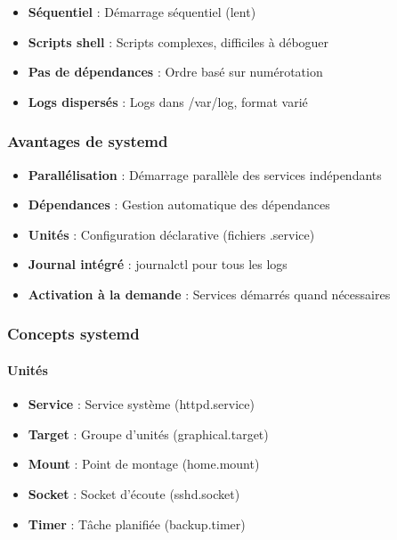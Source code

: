 \documentclass[12pt,a4paper]{article}
\begin{document}
\begin{itemize}
    \item \textbf{Séquentiel} : Démarrage séquentiel (lent)
    \item \textbf{Scripts shell} : Scripts complexes, difficiles à déboguer
    \item \textbf{Pas de dépendances} : Ordre basé sur numérotation
    \item \textbf{Logs dispersés} : Logs dans /var/log, format varié
\end{itemize}

\subsubsection{Avantages de systemd}

\begin{itemize}
    \item \textbf{Parallélisation} : Démarrage parallèle des services indépendants
    \item \textbf{Dépendances} : Gestion automatique des dépendances
    \item \textbf{Unités} : Configuration déclarative (fichiers .service)
    \item \textbf{Journal intégré} : journalctl pour tous les logs
    \item \textbf{Activation à la demande} : Services démarrés quand nécessaires
\end{itemize}

\subsubsection{Concepts systemd}

\paragraph{Unités}
\begin{itemize}
    \item \textbf{Service} : Service système (httpd.service)
    \item \textbf{Target} : Groupe d'unités (graphical.target)
    \item \textbf{Mount} : Point de montage (home.mount)
    \item \textbf{Socket} : Socket d'écoute (sshd.socket)
    \item \textbf{Timer} : Tâche planifiée (backup.timer)
\end{itemize}
\end{document}
